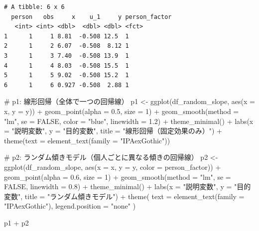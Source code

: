 \documentclass[
  a4paper,
]{ltjsbook}
\newenvironment{Shaded}{\begin{snugshade}}{\end{snugshade}}
\newcommand{\AttributeTok}[1]{\textcolor[rgb]{0.40,0.45,0.13}{#1}}
\newcommand{\CommentTok}[1]{\textcolor[rgb]{0.37,0.37,0.37}{#1}}
\newcommand{\ConstantTok}[1]{\textcolor[rgb]{0.56,0.35,0.01}{#1}}
\newcommand{\DecValTok}[1]{\textcolor[rgb]{0.68,0.00,0.00}{#1}}
\newcommand{\FloatTok}[1]{\textcolor[rgb]{0.68,0.00,0.00}{#1}}
\newcommand{\FunctionTok}[1]{\textcolor[rgb]{0.28,0.35,0.67}{#1}}
\newcommand{\NormalTok}[1]{\textcolor[rgb]{0.00,0.23,0.31}{#1}}
\newcommand{\OtherTok}[1]{\textcolor[rgb]{0.00,0.23,0.31}{#1}}
\newcommand{\SpecialCharTok}[1]{\textcolor[rgb]{0.37,0.37,0.37}{#1}}
\newcommand{\StringTok}[1]{\textcolor[rgb]{0.13,0.47,0.30}{#1}}
\begin{document}
\begin{verbatim}
# A tibble: 6 x 6
  person   obs     x    u_1     y person_factor
   <int> <int> <dbl>  <dbl> <dbl> <fct>        
1      1     1 8.81  -0.508 12.5  1            
2      1     2 6.07  -0.508  8.12 1            
3      1     3 7.40  -0.508 13.9  1            
4      1     4 8.03  -0.508 15.5  1            
5      1     5 9.02  -0.508 15.2  1            
6      1     6 0.927 -0.508  2.88 1            
\end{verbatim}

\begin{Shaded}
\begin{Highlighting}[]
\CommentTok{\# p1: 線形回帰（全体で一つの回帰線）}
\NormalTok{p1 }\OtherTok{\textless{}{-}} \FunctionTok{ggplot}\NormalTok{(df\_random\_slope, }\FunctionTok{aes}\NormalTok{(}\AttributeTok{x =}\NormalTok{ x, }\AttributeTok{y =}\NormalTok{ y)) }\SpecialCharTok{+}
    \FunctionTok{geom\_point}\NormalTok{(}\AttributeTok{alpha =} \FloatTok{0.5}\NormalTok{, }\AttributeTok{size =} \DecValTok{1}\NormalTok{) }\SpecialCharTok{+}
    \FunctionTok{geom\_smooth}\NormalTok{(}\AttributeTok{method =} \StringTok{"lm"}\NormalTok{, }\AttributeTok{se =} \ConstantTok{FALSE}\NormalTok{, }\AttributeTok{color =} \StringTok{"blue"}\NormalTok{, }\AttributeTok{linewidth =} \FloatTok{1.2}\NormalTok{) }\SpecialCharTok{+}
    \FunctionTok{theme\_minimal}\NormalTok{() }\SpecialCharTok{+}
    \FunctionTok{labs}\NormalTok{(}\AttributeTok{x =} \StringTok{"説明変数"}\NormalTok{, }\AttributeTok{y =} \StringTok{"目的変数"}\NormalTok{, }\AttributeTok{title =} \StringTok{"線形回帰（固定効果のみ）"}\NormalTok{) }\SpecialCharTok{+}
    \FunctionTok{theme}\NormalTok{(}\AttributeTok{text =} \FunctionTok{element\_text}\NormalTok{(}\AttributeTok{family =} \StringTok{"IPAexGothic"}\NormalTok{))}

\CommentTok{\# p2: ランダム傾きモデル（個人ごとに異なる傾きの回帰線）}
\NormalTok{p2 }\OtherTok{\textless{}{-}} \FunctionTok{ggplot}\NormalTok{(df\_random\_slope, }\FunctionTok{aes}\NormalTok{(}\AttributeTok{x =}\NormalTok{ x, }\AttributeTok{y =}\NormalTok{ y, }\AttributeTok{color =}\NormalTok{ person\_factor)) }\SpecialCharTok{+}
    \FunctionTok{geom\_point}\NormalTok{(}\AttributeTok{alpha =} \FloatTok{0.6}\NormalTok{, }\AttributeTok{size =} \DecValTok{1}\NormalTok{) }\SpecialCharTok{+}
    \FunctionTok{geom\_smooth}\NormalTok{(}\AttributeTok{method =} \StringTok{"lm"}\NormalTok{, }\AttributeTok{se =} \ConstantTok{FALSE}\NormalTok{, }\AttributeTok{linewidth =} \FloatTok{0.8}\NormalTok{) }\SpecialCharTok{+}
    \FunctionTok{theme\_minimal}\NormalTok{() }\SpecialCharTok{+}
    \FunctionTok{labs}\NormalTok{(}\AttributeTok{x =} \StringTok{"説明変数"}\NormalTok{, }\AttributeTok{y =} \StringTok{"目的変数"}\NormalTok{, }\AttributeTok{title =} \StringTok{"ランダム傾きモデル"}\NormalTok{) }\SpecialCharTok{+}
    \FunctionTok{theme}\NormalTok{(}
      \AttributeTok{text =} \FunctionTok{element\_text}\NormalTok{(}\AttributeTok{family =} \StringTok{"IPAexGothic"}\NormalTok{),}
      \AttributeTok{legend.position =} \StringTok{"none"}
\NormalTok{    )}

\NormalTok{p1 }\SpecialCharTok{+}\NormalTok{ p2}
\end{Highlighting}
\end{Shaded}
\end{document}
